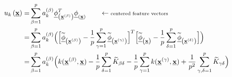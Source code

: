 \begin{align*}
	u_{k}\left (\vec{x} \right ) 
	= & \sum\limits_{\beta = 1}^p a_k^{(\beta)} \vec{\phi}_{\left(\vec{x}^{(\beta)}\right)}^T 
	    \vec{\phi}_{(\vec{x})}	\qquad \leftarrow \text{\scriptsize centered feature vectors} \\
	=  & \sum\limits_{\beta = 1}^p a_k^{(\beta)} 
	    \Big ( \Big [ \widetilde{\vec{\phi}}_{\left(\vec{x}^{(\beta)}\right)}
			  - \frac{1}{p} \sum\limits_{\gamma=1}^p 
				  \widetilde{\vec{\phi}}_{\left(\vec{x}^{(\gamma)}\right)} \Big ]^T 
		   \Big [ \widetilde{\vec{\phi}}_{\left(\vec{x}\right)} 
			  - \frac{1}{p} \sum\limits_{\delta=1}^p 
			      \widetilde{\vec{\phi}}_{\left(\vec{x}^{(\delta)}\right)} \Big ]
	    \Big ) \\
	= &  \sum\limits_{\beta = 1}^p a_k^{(\beta)} 
	    \Big (
		k(\vec{x}^{(\beta)}, \vec{x})
		- \frac{1}{p} \sum\limits_{\delta=1}^p \widetilde K_{\beta \delta} 
		- \frac{1}{p} \sum\limits_{\gamma=1}^p k(\vec{x}^{(\gamma)}, \vec{x})
		+ \frac{1}{p^2} \sum\limits_{\gamma,\delta=1}^p \widetilde K_{\gamma \delta}
	    \Big )
\end{align*}


